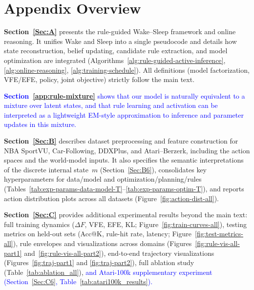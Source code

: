 \documentclass{article} %
\newcommand{\revise}[1]{\textcolor{blue}{#1}}
\begin{document}
\section*{Appendix Overview}
\begin{itemize}
  \item \textbf{Section~\ref{Sec:A}} presents the rule-guided Wake–Sleep framework and online reasoning. 
  It unifies Wake and Sleep into a single pseudocode and details how state reconstruction, belief updating, 
  candidate rule extraction, and model optimization are integrated 
  (Algorithms~\ref{alg:rule-guided-active-inference}, \ref{alg:online-reasoning}, \ref{alg:training-schedule}). 
  All definitions (model factorization, VFE/EFE, policy, joint objective) strictly follow the main text.
  \revise{\item \textbf{Section~\ref{app:rule-mixture}} shows that our model is naturally equivalent to a mixture over latent states, and that rule learning and activation can be interpreted as a lightweight EM-style approximation to inference and parameter updates in this mixture.}
  
  \item \textbf{Section~\ref{Sec:B}} describes dataset preprocessing and feature construction for 
  NBA SportVU, Car-Following, DDXPlus, and Atari–Berzerk, including the action spaces and the world-model inputs. 
  It also specifies the semantic interpretations of the discrete internal state~$m$ (Section~\ref{Sec:B6}), 
  consolidates key hyperparameters for data/model and optimization/planning/rules 
  (Tables~\ref{tab:exp-params-data-model-T}--\ref{tab:exp-params-optim-T}), 
  and reports action distribution plots across all datasets (Figure~\ref{fig:action-dist-all}).

  \item \textbf{Section~\ref{Sec:C}} provides additional experimental results beyond the main text: full training dynamics (\(\Delta F\), VFE, EFE, KL; Figure~\ref{fig:train-curves-all}), 
  testing metrics on held-out sets (Acc@K, rule-hit rate, latency; Figure~\ref{fig:test-metrics-all}), 
  rule envelopes and visualizations across domains
  (Figures~\ref{fig:rule-vis-all-part1} and~\ref{fig:rule-vis-all-part2}),
  end-to-end trajectory visualizations
  (Figures~\ref{fig:traj-part1} and \ref{fig:traj-part2}), 
  full ablation study (Table~\ref{tab:ablation_all}), 
  \revise{and Atari-100k supplementary experiment (Section~\ref{Sec:C6}, Table~\ref{tab:atari100k_results}).}


\end{itemize}
\end{document}
